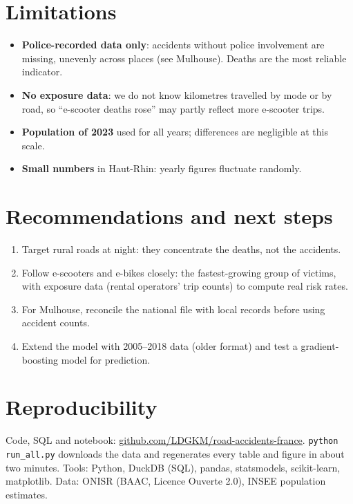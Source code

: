 \documentclass[11pt,a4paper]{article}
\begin{document}
\section{Limitations}
\begin{itemize}
  \item \textbf{Police-recorded data only}: accidents without police involvement are missing, unevenly across
        places (see Mulhouse). Deaths are the most reliable indicator.
  \item \textbf{No exposure data}: we do not know kilometres travelled by mode or by road, so ``e-scooter deaths
        rose'' may partly reflect more e-scooter trips.
  \item \textbf{Population of 2023} used for all years; differences are negligible at this scale.
  \item \textbf{Small numbers} in Haut-Rhin: yearly figures fluctuate randomly.
\end{itemize}

\section{Recommendations and next steps}
\begin{enumerate}
  \item Target rural roads at night: they concentrate the deaths, not the accidents.
  \item Follow e-scooters and e-bikes closely: the fastest-growing group of victims, with exposure data
        (rental operators' trip counts) to compute real risk rates.
  \item For Mulhouse, reconcile the national file with local records before using accident counts.
  \item Extend the model with 2005--2018 data (older format) and test a gradient-boosting model for prediction.
\end{enumerate}

\section*{Reproducibility}
Code, SQL and notebook: \href{https://github.com/LDGKM/road-accidents-france}{github.com/LDGKM/road-accidents-france}.
\texttt{python run\_all.py} downloads the data and regenerates every table and figure in about two minutes.
Tools: Python, DuckDB (SQL), pandas, statsmodels, scikit-learn, matplotlib.
Data: ONISR (BAAC, Licence Ouverte 2.0), INSEE population estimates.
\end{document}
